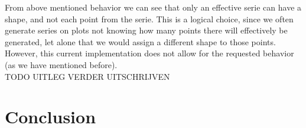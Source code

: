 \documentclass{article}
\begin{document}
From above mentioned behavior we can see that only an effective serie can have a shape, and not each point from the serie. This is a logical choice, since we often generate series on plots not knowing how many points there will effectively be generated, let alone that we would assign a different shape to those points. However, this current implementation does not allow for the requested behavior (as we have mentioned before).\\


TODO UITLEG VERDER UITSCHRIJVEN


\newpage
\section{Conclusion}
\end{document}
